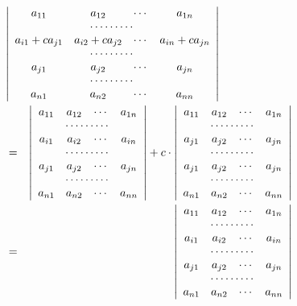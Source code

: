 \begin{enumerate}
$$\begin{eqnarray*}
\lefteqn{\left|\begin{array}{cccc}a_{11} & a_{12} & \cdots & a_{1n} \\
\multicolumn{4}{c}{\cdots\cdots\cdots}\\
a_{i1}+ca_{j1} & a_{i2}+ca_{j2} & \cdots & a_{in}+ca_{jn}\\
\multicolumn{4}{c}{\cdots\cdots\cdots}\\
a_{j1} & a_{j2} & \cdots & a_{jn} \\
\multicolumn{4}{c}{\cdots\cdots\cdots}\\
a_{n1} & a_{n2} & \cdots & a_{nn}
\end{array}\right|}\\
& = & 
\left|\begin{array}{cccc}a_{11} & a_{12} & \cdots & a_{1n} \\
\multicolumn{4}{c}{\cdots\cdots\cdots}\\
a_{i1} & a_{i2} & \cdots & a_{in}\\
\multicolumn{4}{c}{\cdots\cdots\cdots}\\
a_{j1} & a_{j2} & \cdots & a_{jn} \\
\multicolumn{4}{c}{\cdots\cdots\cdots}\\
a_{n1} & a_{n2} & \cdots & a_{nn}
\end{array}\right| + 
c\cdot \left|\begin{array}{cccc}a_{11} & a_{12} & \cdots & a_{1n} \\
\multicolumn{4}{c}{\cdots\cdots\cdots}\\
a_{j1} & a_{j2} & \cdots & a_{jn}\\
\multicolumn{4}{c}{\cdots\cdots\cdots}\\
a_{j1} & a_{j2} & \cdots & a_{jn} \\
\multicolumn{4}{c}{\cdots\cdots\cdots}\\
a_{n1} & a_{n2} & \cdots & a_{nn}
\end{array}\right|\\
& = & \left|\begin{array}{cccc}a_{11} & a_{12} & \cdots & a_{1n} \\
\multicolumn{4}{c}{\cdots\cdots\cdots}\\
a_{i1} & a_{i2} & \cdots & a_{in}\\
\multicolumn{4}{c}{\cdots\cdots\cdots}\\
a_{j1} & a_{j2} & \cdots & a_{jn} \\
\multicolumn{4}{c}{\cdots\cdots\cdots}\\
a_{n1} & a_{n2} & \cdots & a_{nn}
\end{array}\right|
\end{eqnarray*}
\end{enumerate}

